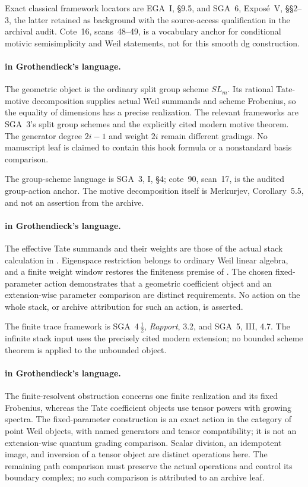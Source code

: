 Exact classical framework locators are EGA~I, \S9.5, and SGA~6, Expos\'e~V, \S\S2--3, the latter retained as background with the source-access qualification in the archival audit. Cote~16, scans~48--49, is a vocabulary anchor for conditional motivic semisimplicity and Weil statements, not for this smooth dg construction.


\paragraph{ in Grothendieck's language.}
The geometric object is the ordinary split group scheme $SL_m$.
Its rational Tate-motive decomposition supplies actual Weil
summands and scheme Frobenius, so the equality of dimensions
has a precise realization. The relevant frameworks are SGA~3's
split group schemes and the explicitly cited modern motive
theorem. The generator degree $2i-1$ and weight $2i$ remain
different gradings. No manuscript leaf is claimed to contain
this hook formula or a nonstandard basis comparison.


The group-scheme language is SGA~3, I, \S4; cote~90, scan~17, is the audited group-action anchor. The motive decomposition itself is Merkurjev, Corollary~5.5, and not an assertion from the archive.


\paragraph{ in Grothendieck's language.}
The effective Tate summands and their weights are those of the
actual stack calculation in . Eigenspace restriction
belongs to ordinary Weil linear algebra, and a finite weight
window restores the finiteness premise of .
The chosen fixed-parameter action demonstrates that a geometric
coefficient object and an extension-wise parameter comparison
are distinct requirements. No action on the whole stack, or
archive attribution for such an action, is asserted.

The finite trace framework is SGA~4\,$\frac12$, \emph{Rapport}, 3.2, and SGA~5, III, 4.7. The infinite stack input uses the precisely cited modern extension; no bounded scheme theorem is applied to the unbounded object.


\paragraph{ in Grothendieck's language.}
The finite-resolvent obstruction concerns one finite realization
and its fixed Frobenius, whereas the Tate coefficient objects
use tensor powers with growing spectra. The fixed-parameter
construction is an exact action in the category of point Weil
objects, with named generators and tensor compatibility; it is
not an extension-wise quantum grading comparison. Scalar
division, an idempotent image, and inversion of a tensor object
are distinct operations here. The remaining path comparison
must preserve the actual operations and control its boundary
complex; no such comparison is attributed to an archive leaf.

